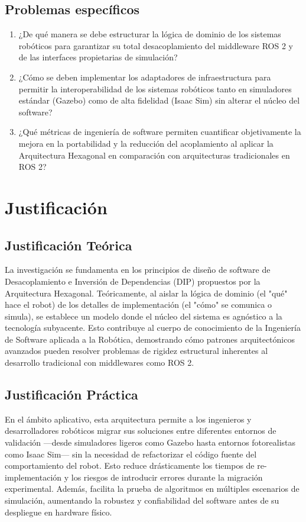 \subsection{Problemas específicos}
\begin{enumerate}
    \item ¿De qué manera se debe estructurar la lógica de dominio de los sistemas robóticos para garantizar su total desacoplamiento del middleware ROS 2 y de las interfaces propietarias de simulación?
    \item ¿Cómo se deben implementar los adaptadores de infraestructura para permitir la interoperabilidad de los sistemas robóticos tanto en simuladores estándar (Gazebo) como de alta fidelidad (Isaac Sim) sin alterar el núcleo del software?
    \item ¿Qué métricas de ingeniería de software permiten cuantificar objetivamente la mejora en la portabilidad y la reducción del acoplamiento al aplicar la Arquitectura Hexagonal en comparación con arquitecturas tradicionales en ROS 2?
\end{enumerate}



\section{Justificación}

\subsection{Justificación Teórica}

La investigación se fundamenta en los principios de diseño de software de Desacoplamiento e Inversión de Dependencias (DIP) propuestos por la Arquitectura Hexagonal. Teóricamente, al aislar la lógica de dominio (el "qué" hace el robot) de los detalles de implementación (el "cómo" se comunica o simula), se establece un modelo donde el núcleo del sistema es agnóstico a la tecnología subyacente. Esto contribuye al cuerpo de conocimiento de la Ingeniería de Software aplicada a la Robótica, demostrando cómo patrones arquitectónicos avanzados pueden resolver problemas de rigidez estructural inherentes al desarrollo tradicional con middlewares como ROS 2.


\subsection{Justificación Práctica}

En el ámbito aplicativo, esta arquitectura permite a los ingenieros y desarrolladores robóticos migrar sus soluciones entre diferentes entornos de validación —desde simuladores ligeros como Gazebo hasta entornos fotorealistas como Isaac Sim— sin la necesidad de refactorizar el código fuente del comportamiento del robot. Esto reduce drásticamente los tiempos de re-implementación y los riesgos de introducir errores durante la migración experimental. Además, facilita la prueba de algoritmos en múltiples escenarios de simulación, aumentando la robustez y confiabilidad del software antes de su despliegue en hardware físico.



